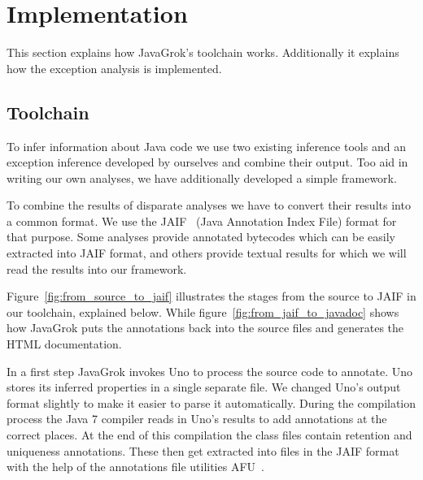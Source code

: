 \section{Implementation}
This section explains how JavaGrok's toolchain works. Additionally it explains
how the exception analysis is implemented.

\subsection{Toolchain}

\begin{figure*}
\centering
{}
\caption{Toolchain from source to JAIF}
\label{fig:from_source_to_jaif}
\end{figure*}

To infer information about Java code we use two existing inference tools and 
an exception inference developed by ourselves and combine their output. 
Too aid in writing our own analyses, we have additionally developed a simple 
framework. 

To combine the results of disparate analyses we have to convert their results
into a common format.  We use the JAIF~\cite{JAIF}
(Java Annotation Index File) format for that purpose.  Some analyses provide 
annotated bytecodes which can be easily extracted into JAIF format, and 
others provide textual results for which we will read the results into our framework.

Figure~\ref{fig:from_source_to_jaif} 
illustrates the stages from the source to JAIF in our toolchain, explained 
below. While figure~\ref{fig:from_jaif_to_javadoc} shows how JavaGrok
puts the annotations back into the source files and generates the HTML
documentation.

\begin{figure*}
\centering
{}
\caption{From JAIF to Javadoc}
\label{fig:from_jaif_to_javadoc}
\end{figure*}

In a first step JavaGrok invokes Uno to process the source code to annotate. 
Uno stores its inferred properties in a single separate file. We changed Uno's 
output format slightly to make it easier to parse it automatically.
During the compilation process the Java 7 compiler reads in Uno's results 
to add annotations at the correct places. 
At the end of this compilation the class files contain retention and uniqueness
annotations. These then get extracted into files in the JAIF format with the
help of the annotations file utilities AFU~\cite{AFU}.

